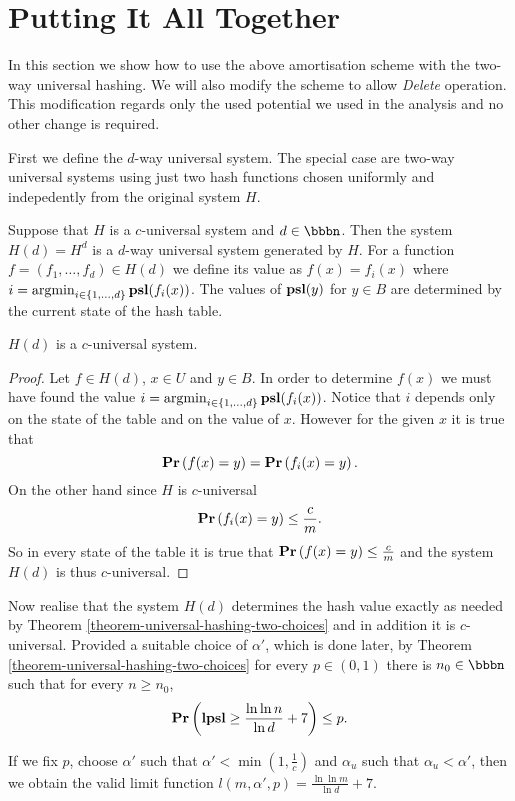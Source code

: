 \documentclass[runningheads,a4paper]{llncs}
\begin{document}
\section{Putting It All Together}
In this section we show how to use the above amortisation scheme with the two-way universal hashing. We will also modify the scheme to allow \emph{Delete} operation. This modification regards only the used potential we used in the analysis and no other change is required.

First we define the $d$-way universal system. The special case are two-way universal systems using just two hash functions chosen uniformly and indepedently from the original system $H$.
\begin{definition} 
Suppose that $H$ is a $c$-universal system and $d \in \bbbn$. Then the system $H(d) = H^d$ is a $d$-way universal system generated by $H$. For a function $f = (f_1, \dots, f_d) \in H(d)$ we define its value as $f(x) = f_i(x)$ where $i = \operatorname{argmin}_{i \in \{1, \dots, d\}} \mathbf{psl}(f_i(x))$. The values of $\mathbf{psl}(y)$ for $y \in B$ are determined by the current state of the hash table.
\end{definition}

\begin{lemma}
$H(d)$ is a $c$-universal system.
\begin{proof}
Let $f \in H(d)$, $x \in U$ and $y \in B$. In order to determine $f(x)$ we must have found the value $i = \operatorname{argmin}_{i \in \{1, \dots, d\}} \mathbf{psl}(f_i(x))$. Notice that $i$ depends only on the state of the table and on the value of $x$. However for the given $x$ it is true that \[ \mathbf{Pr}\left(f(x) = y\right) = \mathbf{Pr}\left(f_i(x) = y\right). \] On the other hand since $H$ is $c$-universal \[ \mathbf{Pr}\left(f_i(x) = y\right) \leq \frac{c}{m}. \] So in every state of the table it is true that $\mathbf{Pr}\left(f(x) = y\right) \leq \frac{c}{m}$ and the system $H(d)$ is thus $c$-universal.
\end{proof}
\end{lemma}

Now realise that the system $H(d)$ determines the hash value exactly as needed by Theorem \ref{theorem-universal-hashing-two-choices} and in addition it is $c$-universal. Provided a suitable choice of $\alpha'$, which is done later, by Theorem \ref{theorem-universal-hashing-two-choices} for every $p \in (0, 1)$ there is $n_0 \in \bbbn$ such that for every $n \geq n_0$,
\[
	\mathbf{Pr}\left(\mathbf{lpsl} \geq \frac{\ln \ln n}{\ln d} + 7\right) \leq p.
\]

If we fix $p$, choose $\alpha'$ such that $\alpha' < \min(1, \frac{1}{c})$ and $\alpha_u$ such that $\alpha_u < \alpha'$, then we obtain the valid limit function $l(m, \alpha', p) = \frac{\ln \ln m}{\ln d} + 7$. 
\end{document}
